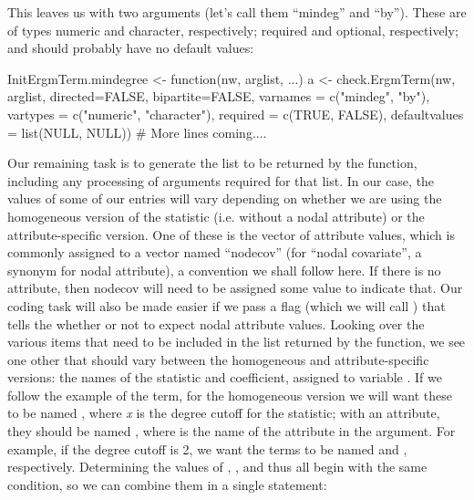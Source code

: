 \documentclass[nojss]{jss}
\begin{document}
This leaves us with two arguments (let's call them ``mindeg'' and ``by''). These
are of types numeric and character, respectively; required and optional,
respectively; and should probably have no default values:
 \begin{CodeChunk}
\begin{CodeInput}
InitErgmTerm.mindegree <- function(nw, arglist, ...) {
  a <- check.ErgmTerm(nw, arglist, directed=FALSE, bipartite=FALSE,
          varnames = c("mindeg", "by"),
          vartypes = c("numeric", "character"),
          required = c(TRUE, FALSE),
          defaultvalues = list(NULL, NULL))
  # More lines coming....
}
\end{CodeInput}
\end{CodeChunk}

Our remaining task is to generate the list to be returned by the function,
including any processing of arguments required for that list. In our case, the
values of some of our entries will vary depending on whether we are using the
homogeneous version of the statistic (i.e. without a nodal attribute) or the
attribute-specific version. One of these is the vector of attribute values,
which is commonly assigned to a vector named ``nodecov'' (for ``nodal
covariate'', a synonym for nodal attribute), a convention we shall follow here.
If there is no attribute, then nodecov will need to be assigned some value to
indicate that. Our  coding task will also be made easier if we pass
a flag (which we will call ) that tells the  whether
or not to expect nodal attribute values. Looking over the various items that
need to be included in the list returned by the function, we see one other that
should vary between the homogeneous and attribute-specific versions: the names
of the statistic and coefficient, assigned to variable . If we
follow the example of the  term, for the homogeneous version we
will want these to be named , where {\it x} is the degree
cutoff for the statistic; with an attribute, they should be named
, where  is the name of the
attribute in the  argument. For example, if the degree cutoff is 2, we
want the terms to be named  and ,
respectively. Determining the values of , , and
 thus all begin with the same condition, so we can combine them
in a single  statement:
\begin{CodeChunk}
\end{CodeChunk}
\end{document}
